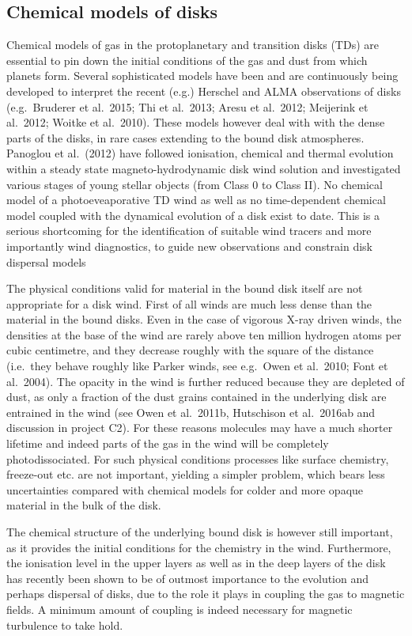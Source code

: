 \documentclass[10pt,fleqn,twoside]{article}
\begin{document}
\subsection{Chemical models of disks}

Chemical models of gas in the protoplanetary and transition disks
(TDs) are essential to pin down the initial conditions of the gas and
dust from which planets form. Several sophisticated models have been
and are continuously being developed to interpret the recent (e.g.)
Herschel and ALMA observations of disks (e.g.\ Bruderer et al.\ 2015;
Thi et al.\ 2013; Aresu et al.\ 2012; Meijerink et al.\ 2012; Woitke
et al.\ 2010). These models however deal with with the dense parts of
the disks, in rare cases extending to the bound disk
atmospheres. Panoglou et al.\ (2012) have followed ionisation,
chemical and thermal evolution within a steady state
magneto-hydrodynamic disk wind solution and investigated various
stages of young stellar objects (from Class 0 to Class II).  No
chemical model of a photoeveaporative TD wind as well as no
time-dependent chemical model coupled with the dynamical evolution of
a disk exist to date. This is a serious shortcoming for the
identification of suitable wind tracers and more importantly wind
diagnostics, to guide new observations and constrain disk dispersal
models 

The physical conditions valid for material in the bound disk itself
are not appropriate for a disk wind. First of all winds are much less
dense than the material in the bound disks. Even in the case of
vigorous X-ray driven winds, the densities at the base of the wind are
rarely above ten million hydrogen atoms per cubic centimetre, and they
decrease roughly with the square of the distance (i.e.\ they behave
roughly like Parker winds, see e.g.\ Owen et al.\ 2010; Font et al.\
2004). The opacity in the wind is further reduced because they are
depleted of dust, as only a fraction of the dust grains contained
in the underlying disk are entrained in the wind (see Owen et al.\
2011b, Hutschison et al.\ 2016ab and discussion in project C2). For
these reasons molecules may have a much shorter lifetime and indeed
parts of the gas in the wind will be completely photodissociated. For
such physical conditions processes like surface chemistry, freeze-out
etc. are not important, yielding a simpler problem, which bears less
uncertainties compared with chemical models for colder and more opaque
material in the bulk of the disk.  

The chemical structure of the underlying bound disk is however still
important, as it provides the initial conditions for the chemistry in
the wind. Furthermore, the ionisation level in the upper layers as
well as in the deep layers of the disk has recently been shown to be of outmost importance to the evolution and perhaps dispersal of disks, due to the role it plays in coupling the gas to magnetic fields. A minimum amount of coupling is indeed necessary for magnetic turbulence to take hold.
\end{document}
